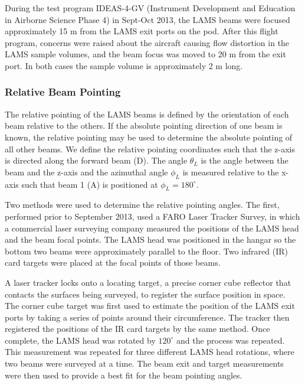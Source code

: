 \documentclass[12pt,twoside,english]{article}\usepackage[]{graphicx}\usepackage[]{color}
\let\OrgIndex\index
\renewcommand*{\index}[1]{\OrgIndex{#1}}
\begin{document}
{{During the test program IDEAS-4-GV (Instrument Development and Education in Airborne Science Phase 4) in Sept-Oct 2013, the LAMS beams were focused approximately 15 m from the LAMS exit ports on the pod. After this flight program, concerns were raised about the aircraft causing flow distortion in the LAMS sample  volumes, and the beam focus was moved to 20 m from the exit port. In both cases the sample volume is approximately 2 m long. 

\subsubsection{Relative Beam Pointing}

The relative pointing of the LAMS beams is defined by the orientation of each beam relative to the others. If the absolute pointing direction of one beam is known, the relative pointing may be used to determine the absolute pointing of all other beams. We define the relative pointing coordinates such that the z-axis is directed along the forward beam (D). The angle $\theta_{L}$ is the angle between the beam and the z-axis and the azimuthal angle $\phi_{L}$ is measured relative to the x-axis such that beam 1 (A) is positioned at $\phi_{L}=180^{\circ}$.%

Two methods were used to determine the relative pointing angles. The first, performed prior to September 2013, used a FARO Laser Tracker Survey, in which a commercial laser surveying company measured the positions of the LAMS head and the beam focal points. The 
LAMS head was positioned in the hangar so the bottom two beams were approximately parallel to the floor. Two infrared (IR) card targets were placed at the focal points of those beams. 

A laser tracker locks onto a locating target, a precise corner cube reflector that contacts the surfaces being surveyed, to register the surface
position in space. The corner cube target was first used to estimate the position of the LAMS exit ports by taking a series of points around their circumference. The tracker then registered the positions of the IR card targets by the same method. Once complete, the LAMS head was rotated by $120^{\circ}$ and the process was repeated. This measurement was repeated for three different LAMS head rotations, where two beams were surveyed at a time. 
The beam exit and target measurements were then used to provide a best fit for the beam pointing angles. 

}}
\end{document}
